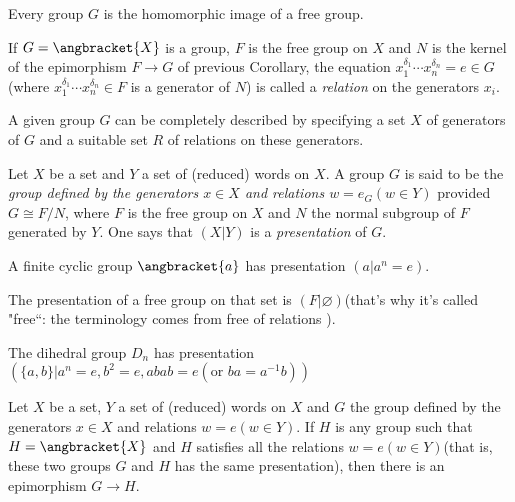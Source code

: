\begin{Corollary}
	Every group $ G $ is the homomorphic image of a free group.
\end{Corollary}

\begin{Definition}
	If $ G=\angbracket{X} $ is a group, $ F $ is the free group on $ X $ and $ N $ is the kernel of the epimorphism $ F \to G $ of previous Corollary, the equation $ x_1^{\delta_1}\cdots x_n^{\delta_n}=e \in G $(where $ x_1^{\delta_1}\cdots x_n^{\delta_n} \in F$ is a generator of $ N $) is called a \textit{relation} on the generators $ x_i $.
\end{Definition}
A given group $ G $ can be completely described by specifying a set $ X $ of generators of $ G $ and a suitable set $ R $ of relations on these generators.
\begin{Definition}
	Let $ X $ be a set and $ Y $ a set of (reduced) words on $ X $. A group $ G $ is said to be the \textit{group defined by the generators $ x \in X $ and relations $ w =e_G (w \in Y) $} provided $ G \cong F/N $, where $ F $ is the free group on $ X $ and $ N $ the normal subgroup of $ F $ generated by $ Y $. One says that $ (X|Y) $ is a \textit{presentation} of $ G $.
\end{Definition}
\begin{Example}
	A finite cyclic group $ \angbracket{a} $ has presentation $ (a|a^n=e) $.
\end{Example}
\begin{Example}
	The presentation of a free group on that set is $(F|\varnothing) $(that's why it's called "free``: the terminology comes from free of relations ).
\end{Example}
\begin{Example}
	The dihedral group $ D_n $ has presentation $ (\{a,b \}|a^n=e, b^2=e,abab=e(\text{or } ba=a^{-1}b)) $
\end{Example}
\begin{Theorem}
	Let $ X $ be a set, $ Y $ a set of (reduced) words on $ X $ and $ G $ the group defined by the generators $ x \in X $ and relations $ w = e(w \in Y) $. If $ H $ is any group such that $ H = \angbracket{X} $ and $ H $ satisfies all the relations $ w = e(w \in Y)  $(that is, these two groups $ G $ and $ H $ has the same presentation), then there is an epimorphism $ G \to H $.
\end{Theorem}
